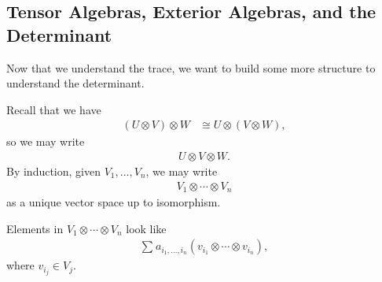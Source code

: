 \documentclass[10pt]{mypackage}
\begin{document}
  \subsection{Tensor Algebras, Exterior Algebras, and the Determinant}%
  Now that we understand the trace, we want to build some more structure to understand the determinant.\newline


    Recall that we have
    \begin{align*}
      \left(U\otimes V\right) \otimes W &\cong U\otimes \left(V\otimes W\right),
    \end{align*}
    so we may write
    \begin{align*}
      U\otimes V \otimes W.
    \end{align*}
  By induction, given $V_1,\dots,V_n$, we may write
  \begin{align*}
    V_1\otimes \cdots \otimes V_n
  \end{align*}
  as a unique vector space up to isomorphism.\newline

  Elements in $V_1\otimes \cdots \otimes V_n$ look like
  \begin{align*}
    \sum_{}a_{i_1,\dots,i_{n}}\left(v_{i_1}\otimes\cdots\otimes v_{i_n}\right),
  \end{align*}
  where $v_{i_j}\in V_j$.\newline
\end{document}
